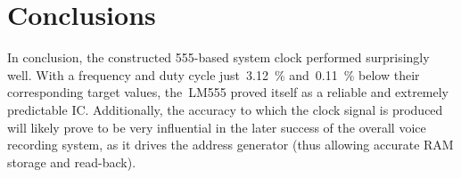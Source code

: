 \section{Conclusions}

In conclusion, the constructed 555-based system clock performed surprisingly
well.  With a frequency and duty cycle just~\SI{3.12}{\percent}
and~\SI{0.11}{\percent} below their corresponding target values, the~LM555
proved itself as a reliable and extremely predictable IC.  Additionally, the
accuracy to which the clock signal is produced will likely prove to be very
influential in the later success of the overall voice recording system, as it
drives the address generator (thus allowing accurate RAM storage and
read-back).
